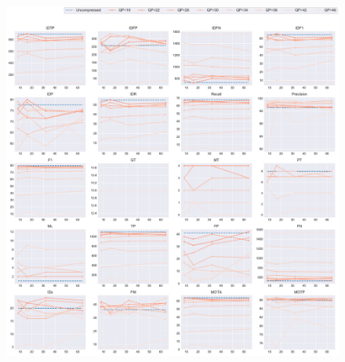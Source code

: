 \begin{figure}[!htbp]
\centering
\includegraphics[width=1.0\linewidth]{img/appendix/RaceHorsesD_all_multiplots_msr.pdf}
\caption[Result of all object classes in Class D RaceHorsesD with Horizontal Axis of MSR]{}
\label{fig:RaceHorsesD_all_msr}
\end{figure}



